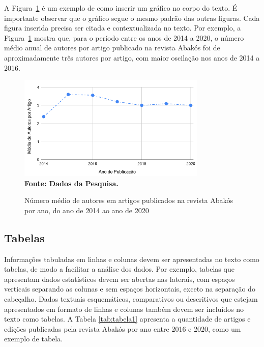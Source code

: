 \documentclass[a4paper,12pt]{article}
\begin{document}
	A Figura~\ref{fig:figura3} é um exemplo de como inserir um gráfico no corpo do texto. É importante observar que o gráfico segue o mesmo padrão das outras figuras. Cada figura inserida precisa ser citada e contextualizada no texto. Por exemplo, a Figura~\ref{fig:figura3} mostra que, para o período entre os anos de 2014 a 2020, o número médio anual de autores por artigo publicado na revista Abakós foi de aproximadamente três autores por artigo, com maior oscilação nos anos de 2014 a 2016.
	
	\begin{figure}[ht]
		\centering	
		\caption[Média de Autores por Artigo.]{Número médio de autores em artigos publicados na revista Abakós por ano, do ano de 2014 ao ano de 2020}
		\label{fig:figura3}
		\includegraphics[width=0.8\textwidth]{figuras/AutoresPorArtigoNaRevistaAbakos.png}\\
		\textbf{\footnotesize Fonte: Dados da Pesquisa.}
	\end{figure}
	
	
	
	\subsection{Tabelas}
	
	Informações tabuladas em linhas e colunas devem ser apresentadas no texto como tabelas, de modo a facilitar a análise dos dados. Por exemplo, tabelas que apresentam dados estatísticos devem ser abertas nas laterais, com espaços verticais separando as colunas e sem espaços horizontais, exceto na separação do cabeçalho. Dados textuais esquemáticos, comparativos ou descritivos que estejam apresentados em formato de linhas e colunas também devem ser incluídos no texto como tabelas. A Tabela \ref{tab:tabela1} apresenta a quantidade de artigos e edições publicadas pela revista Abakós por ano entre 2016 e 2020, como um exemplo de tabela.
	
\end{document}
